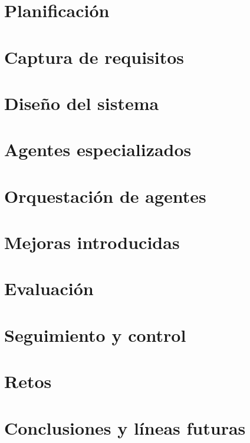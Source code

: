 \documentclass[a4page, 11pt, showtrims]{memoir}
\begin{document}
\chapter{Planificación} \label{ch:chap3}

\clearpage
\chapter{Captura de requisitos} \label{ch:chap4}

\clearpage
\chapter{Diseño del sistema} \label{ch:chap5}

\clearpage
\chapter{Agentes especializados} \label{ch:chap6}

\clearpage
\chapter{Orquestación de agentes} \label{ch:chap7}

\clearpage
\chapter{Mejoras introducidas} \label{ch:chap8}

\clearpage
\chapter{Evaluación} \label{ch:chap9}

\clearpage
\chapter{Seguimiento y control} \label{ch:chap10}

\clearpage
\chapter{Retos} \label{ch:chap11}

\clearpage
\chapter{Conclusiones y líneas futuras} \label{ch:chap12}

\clearpage



\end{document}

